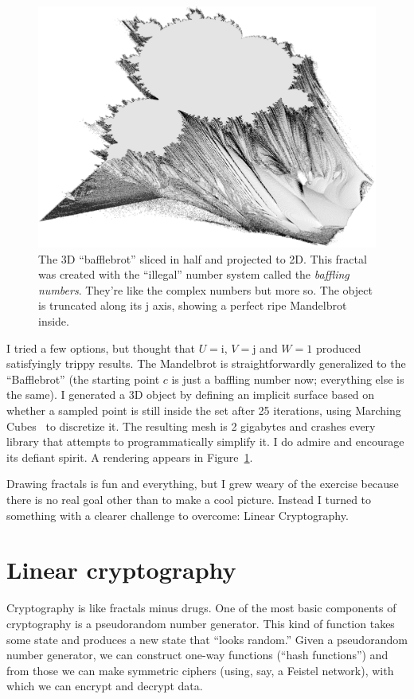 \documentclass[twocolumn]{article}
\begin{document}
\begin{figure}[htp]
  \begin{center}
    \includegraphics[width=0.95 \linewidth]{bafflebrot}
  \end{center}
  \caption{
    The 3D ``bafflebrot'' sliced in half and projected to 2D.
    This fractal was created with the ``illegal'' number system
    called the {\it baffling numbers}. They're like the complex
    numbers but more so. The object is truncated along its
    $\textrm{j}$ axis, showing a perfect ripe Mandelbrot inside.
  } \label{fig:bafflebrot}
\end{figure}

I tried a few options, but thought that $U = \textrm{i}$, $V =
\textrm{j}$ and $W = 1$ produced satisfyingly trippy results. The
Mandelbrot is straightforwardly generalized to the ``Bafflebrot'' (the
starting point $c$ is just a baffling number now; everything else is
the same). I generated a 3D object by defining an implicit surface
based on whether a sampled point is still inside the set after 25
iterations, using Marching Cubes~\cite{lorensen1987marching} to
discretize it. The resulting mesh is 2 gigabytes and crashes every
library that attempts to programmatically simplify it. I do admire and
encourage its defiant spirit. A rendering appears in
Figure~\ref{fig:bafflebrot}.

\medskip
Drawing fractals is fun and everything, but I grew weary of the
exercise because there is no real goal other than to make a cool
picture. Instead I turned to something with a clearer challenge to
overcome: Linear Cryptography.

\section{Linear cryptography} \label{sec:eightbitchoppy}
Cryptography is like fractals minus drugs. One of the most basic
components of cryptography is a pseudorandom number generator. This
kind of function takes some state and produces a new state that
``looks random.'' Given a pseudorandom number generator, we can
construct one-way functions (``hash functions'') and from those we can
make symmetric ciphers (using, say, a Feistel network), with which we
can encrypt and decrypt data.
\end{document}
